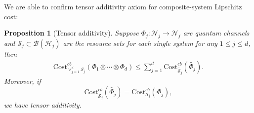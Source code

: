 \documentclass[11pt,reqno]{amsart}
\numberwithin{equation}{section}
\newtheorem{prop}[lemma]{Proposition}
\newcommand{\wt}{\widetilde}
\newcommand{\mc}{\mathcal}
\newcommand{\Cost}{\mathrm{Cost}}
\begin{document}
We are able to confirm tensor additivity axiom for composite-system Lipschitz cost: 
\begin{prop}[Tensor additivity]\label{main:additivity}
Suppose $\Phi_j: \mc N_j \to \mc N_j$ are quantum channels and $\mc S_j \subset \mc B(\mc H_j)$ are the resource sets for each single system for any $1\le j \le d$, then 
\begin{equation}
\begin{aligned}
    \Cost_{\vee_{j=1}^d \mc S_j}^{cb}(\Phi_1 \otimes \cdots \otimes \Phi_d) \le \sum_{j=1}^d \Cost_{\wt {\mc S_j}}^{cb}(\wt {\Phi_j}).
\end{aligned}
\end{equation}
Moreover, if
\begin{equation}\label{eqn:lifted cost}
    \Cost_{\wt {\mc S_j}}^{cb}(\wt {\Phi_j}) = \Cost_{\mc S_j}^{cb}(\Phi_j),
\end{equation}
we have tensor additivity.
\end{prop}
\end{document}

